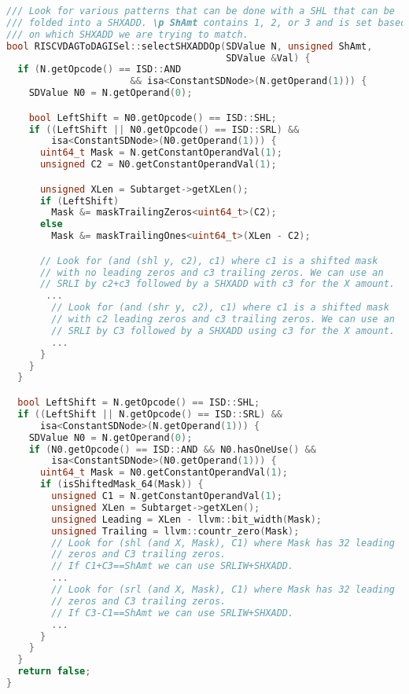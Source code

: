 \begin{lstlisting}[language=C++, caption={Implementation of the ComplexPattern for "sh1add\_op"}]
/// Look for various patterns that can be done with a SHL that can be 
/// folded into a SHXADD. \p ShAmt contains 1, 2, or 3 and is set based 
/// on which SHXADD we are trying to match.
bool RISCVDAGToDAGISel::selectSHXADDOp(SDValue N, unsigned ShAmt,
                                       SDValue &Val) {
  if (N.getOpcode() == ISD::AND 
                      && isa<ConstantSDNode>(N.getOperand(1))) {
    SDValue N0 = N.getOperand(0);

    bool LeftShift = N0.getOpcode() == ISD::SHL;
    if ((LeftShift || N0.getOpcode() == ISD::SRL) &&
        isa<ConstantSDNode>(N0.getOperand(1))) {
      uint64_t Mask = N.getConstantOperandVal(1);
      unsigned C2 = N0.getConstantOperandVal(1);

      unsigned XLen = Subtarget->getXLen();
      if (LeftShift)
        Mask &= maskTrailingZeros<uint64_t>(C2);
      else
        Mask &= maskTrailingOnes<uint64_t>(XLen - C2);

      // Look for (and (shl y, c2), c1) where c1 is a shifted mask 
      // with no leading zeros and c3 trailing zeros. We can use an 
      // SRLI by c2+c3 followed by a SHXADD with c3 for the X amount.
       ...
        // Look for (and (shr y, c2), c1) where c1 is a shifted mask 
        // with c2 leading zeros and c3 trailing zeros. We can use an
        // SRLI by C3 followed by a SHXADD using c3 for the X amount.
        ...
      }
    }
  }

  bool LeftShift = N.getOpcode() == ISD::SHL;
  if ((LeftShift || N.getOpcode() == ISD::SRL) &&
      isa<ConstantSDNode>(N.getOperand(1))) {
    SDValue N0 = N.getOperand(0);
    if (N0.getOpcode() == ISD::AND && N0.hasOneUse() &&
        isa<ConstantSDNode>(N0.getOperand(1))) {
      uint64_t Mask = N0.getConstantOperandVal(1);
      if (isShiftedMask_64(Mask)) {
        unsigned C1 = N.getConstantOperandVal(1);
        unsigned XLen = Subtarget->getXLen();
        unsigned Leading = XLen - llvm::bit_width(Mask);
        unsigned Trailing = llvm::countr_zero(Mask);
        // Look for (shl (and X, Mask), C1) where Mask has 32 leading 
        // zeros and C3 trailing zeros. 
        // If C1+C3==ShAmt we can use SRLIW+SHXADD.
        ...
        // Look for (srl (and X, Mask), C1) where Mask has 32 leading
        // zeros and C3 trailing zeros. 
        // If C3-C1==ShAmt we can use SRLIW+SHXADD.
        ...
      }
    }
  }
  return false;
}
\end{lstlisting}

